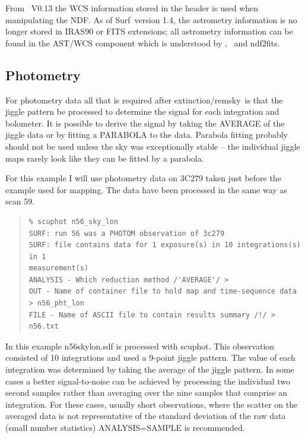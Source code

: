 \documentclass[twoside,11pt]{article}
\newcommand{\scusoft}          {{\sc Surf}}
\newcommand{\Kappa}{\xref{{\sc{Kappa}}}{sun95}{}}
\newcommand{\gaia}{\xref{{\sc{Gaia}}}{sun214}{}}
\newcommand{\task}[1]{{\sf #1}}
\newcommand{\scuphot}{\htmlref{\task{scuphot}}{SCUPHOT}}
\newcommand{\ext}{\htmlref{\task{extinction}}{EXTINCTION}}
\newcommand{\remsky}{\htmlref{\task{remsky}}{REMSKY}}
\newcommand{\ndffits}{\xref{\task{ndf2fits}}{sun55}{NDF2FITS}}
\newenvironment{myquote}{\begin{quote}\begin{small}}{\end{small}\end{quote}}
\newcommand{\htmlref}[2]{#1}
\newcommand{\xref}[3]{#1}
\renewcommand{\_}{\texttt{\symbol{95}}}
\begin{document}
From \Kappa\ V0.13 the WCS information stored in the header is used when
manipulating the NDF. As of \scusoft\ version 1.4, the astrometry information
is no longer stored in IRAS90 or FITS extensions; all astrometry information
can be found in the AST/WCS component which is understood by \Kappa,
\gaia\ and \ndffits.


\subsection{Photometry}

For photometry data all that is required after \ext/\remsky\ is that the
jiggle pattern be processed to determine the signal for each integration and
bolometer. It is possible to derive the signal by taking the AVERAGE of the
jiggle data or by fitting a PARABOLA to the data. Parabola fitting probably
should not be used unless the sky was exceptionally stable -- the individual
jiggle maps rarely look like they can be fitted by a parabola.

For this example I will use photometry data on 3C279 taken just before
the example used for mapping. The data have been processed in the same 
way as scan 59.

\begin{myquote}
\begin{verbatim}
% scuphot n56_sky_lon
SURF: run 56 was a PHOTOM observation of 3c279
SURF: file contains data for 1 exposure(s) in 10 integrations(s) in 1
measurement(s)
ANALYSIS - Which reduction method /'AVERAGE'/ > 
OUT - Name of container file to hold map and time-sequence data > n56_pht_lon 
FILE - Name of ASCII file to contain results summary /!/ > n56.txt
\end{verbatim}
\end{myquote}

In this example n56\_sky\_lon.sdf is processed with \scuphot.  This
observation consisted of 10 integrations and used a 9-point jiggle pattern.
The value of each integration was determined by taking the average of the
jiggle pattern. In some cases a better signal-to-noise can be achieved
by processing the individual two second samples rather than averaging
over the nine samples that comprise an integration. For these cases, usually
short observations, where the scatter on the averaged data is not
representative of the standard deviation of the raw data (small number
statistics) ANALYSIS=SAMPLE is recommended.
\end{document}
